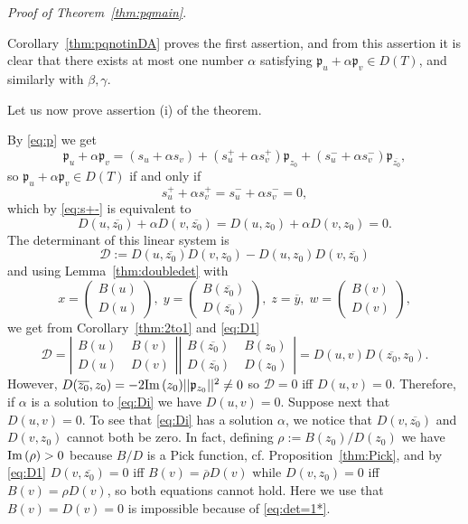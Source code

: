 \documentclass [12pt]{article}
\def\Im{{\rm Im}\,}
\newcommand{\D}{\mathbb{D}}
\begin{document}
{\it Proof of Theorem~\ref{thm:pqmain}}.

Corollary~\ref{thm:pqnotinDA} proves the first assertion,  and from this assertion it is clear that there exists at most one number $\alpha$ satisfying $\mathfrak{p}_u+\alpha\mathfrak{p}_v\in D(T)$, and similarly with $\beta, \gamma$.

 Let us now prove assertion (i) of the theorem.

By \eqref{eq:p} we get
$$
\mathfrak{p}_u+\alpha \mathfrak{p}_v=(s_u+\alpha s_v) + (s_u^+ +\alpha s_v^+)\mathfrak{p}_{z_0}+
(s_u^- +\alpha s_v^-)\mathfrak{p}_{\overline{z_0}},
$$
so $\mathfrak{p}_u+\alpha\mathfrak{p}_v\in D(T)$ if and only if 
$$
s_u^+ +\alpha s_v^+=s_u^- +\alpha s_v^-=0,
$$
which by \eqref{eq:s+-} is equivalent to 
\begin{equation}\label{eq:Di}
D(u,\overline{z_0})+\alpha D(v,\overline{z_0})=D(u,z_0)+\alpha D(v,z_0)=0.
\end{equation}
 The determinant of this linear system is 
\begin{equation*}\label{eq:det}
\mathcal D:=D(u,\overline{z_0})D(v,z_0)-D(u,z_0)D(v,\overline{z_0})
\end{equation*}
and using Lemma~\ref{thm:doubledet} with
$$
x=\begin{pmatrix} B(u)\\D(u) \end{pmatrix},\; y=\begin{pmatrix}B(\overline{z_0})\\
D(\overline{z_0})\end{pmatrix},\; z=\overline{y},\;w=\begin{pmatrix} B(v)\\D(v)\end{pmatrix},
$$
we get from Corollary~\ref{thm:2to1} and \eqref{eq:D1}
$$
\mathcal D=\left|\begin{array}{cc}
 B(u)&\;B(v)\\D(u)&\;D(v)\end{array}\right|\left|\begin{array}{cc}
 B(\overline{z_0})&\;B(z_0)\\D(\overline{z_0})&\;D(z_0)\end{array}\right|
=D(u,v)D(\overline{z_0},z_0).
$$
However, $D(\overline{z_0},z_0)=-2\Im(z_0)||\mathfrak{p}_{z_0}||^2\neq 0$ so $\mathcal D=0$ iff $D(u,v)=0$.
Therefore, if $\alpha$ is a solution to \eqref{eq:Di} we have $D(u,v)=0$. Suppose next that  
$D(u,v)=0$. To see that \eqref{eq:Di} has a solution $\alpha$, we notice that $D(v,\overline{z_0})$ and $D(v,z_0)$ cannot both be zero.
In fact, defining $\rho:=B(z_0)/D(z_0)$ we have $\Im(\rho)>0$ because $B/D$ is a Pick function, cf. Proposition~\ref{thm:Pick}, and
by \eqref{eq:D1} $D(v,\overline{z_0})=0$ iff $B(v)=\overline{\rho}D(v)$ while $D(v,z_0)=0$ iff $B(v)=\rho D(v)$, so both equations cannot hold. Here we use that $B(v)=D(v)=0$ is impossible because of \eqref{eq:det=1*}.
\end{document}
